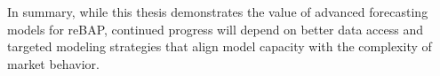 \documentclass[class=scrbook, crop=false]{standalone}
\begin{document}
In summary, while this thesis demonstrates the value of advanced forecasting models for reBAP, continued progress will depend on better data access and targeted modeling strategies that align model capacity with the complexity of market behavior.



\end{document}
